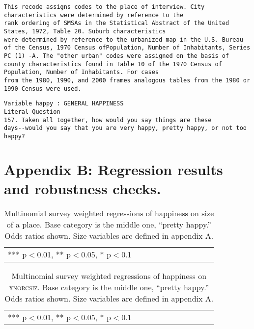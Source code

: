 \documentclass[12pt, letterpaper]{article}
\begin{document}
\begin{spacing}{1.9}
{\begin{verbatim}
This recode assigns codes to the place of interview. City
characteristics were determined by reference to the
rank ordering of SMSAs in the Statistical Abstract of the United
States, 1972, Table 20. Suburb characteristics
were determined by reference to the urbanized map in the U.S. Bureau
of the Census, 1970 Census ofPopulation, Number of Inhabitants, Series
PC (1) -A. The "other urban" codes were assigned on the basis of
county characteristics found in Table 10 of the 1970 Census of
Population, Number of Inhabitants. For cases
from the 1980, 1990, and 2000 frames analogous tables from the 1980 or
1990 Census were used.
\end{verbatim}


\begin{verbatim}
Variable happy : GENERAL HAPPINESS
Literal Question
157. Taken all together, how would you say things are these
days--would you say that you are very happy, pretty happy, or not too
happy?
\end{verbatim}

}




\section*{Appendix B: Regression results and robustness checks.}

\begin{table}[h!]\centering
\caption{Multinomial survey weighted regressions of happiness on size of a
  place. Base category is the middle one, ``pretty happy.'' Odds ratios shown. Size variables are defined
in appendix A.} \label{reg_d_size}
\begin{scriptsize} \begin{tabular}{p{2in}p{.55in}p{.55in}p{.55in}p{.55in}p{.55in}p{.55in}p{.55in}p{.55in}p{.55in}p{.55 in}}\hline

\hline  *** p$<$0.01, ** p$<$0.05, * p$<$0.1
\end{tabular}\end{scriptsize}\end{table}

\begin{table}[h!]\centering
\caption{Multinomial survey weighted regressions of happiness on
  \textsc{xnorcsiz}. Base category is the middle one, ``pretty happy.'' Odds ratios shown.  Size variables are defined
in appendix A.} \label{reg_xnorcsiz}
\begin{scriptsize} \begin{tabular}{p{2in}p{.55in}p{.55in}p{.55in}p{.55in}p{.55in}p{.55in}p{.55in}p{.55in}p{.55in}p{.55 in}}\hline

\hline  *** p$<$0.01, ** p$<$0.05, * p$<$0.1
\end{tabular}\end{scriptsize}\end{table}



\end{spacing}
\end{document}
